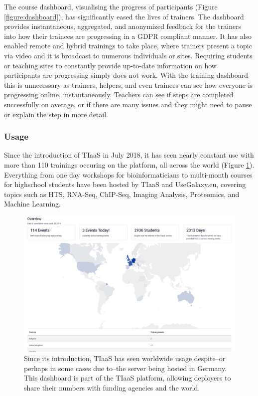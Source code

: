 \documentclass[a4paper,num-refs]{oup-contemporary}
\begin{document}
The course dashboard, visualising the progress of participants (Figure \ref{figure:dashboard}), has significantly eased the lives of trainers. The dashboard provides instantaneous, aggregated, and anonymized feedback for the trainers into how their trainees are progressing in a GDPR compliant manner. It has also enabled remote and hybrid trainings to take place, where trainers present a topic via video and it is broadcast to numerous individuals or sites. Requiring students or teaching sites to constantly provide up-to-date information on how participants are progressing simply does not work. With the training dashboard this is unnecessary as trainers, helpers, and even trainees can see how everyone is progressing online, instantaneously. Teachers can see if steps are completed successfully on average, or if there are many issues and they might need to pause or explain the step in more detail.

\subsubsection{Usage}
Since the introduction of TIaaS in July 2018, it has seen nearly constant use with more than 110 trainings occuring on the platform, all across the world (Figure \ref{figure:map}). Everything from one day workshops for bioinformaticians to multi-month courses for highschool students have been hosted by TIaaS and UseGalaxy.eu, covering topics such as HTS, RNA-Seq, ChIP-Seq, Imaging Analysis, Proteomics, and Machine Learning.

\begin{figure}[bt!]
\centering
\includegraphics[width=\linewidth]{images/map.png}
	\caption{Since its introduction, TIaaS has seen worldwide usage despite--or perhaps in some cases due to--the server being hosted in Germany. This dashboard is part of the TIaaS platform, allowing deployers to share their numbers with funding agencies and the world.}\label{figure:map}
\end{figure}
\end{document}

